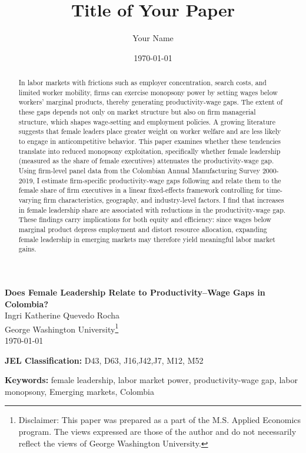 \documentclass[12pt]{article}
\title{\textbf{Title of Your Paper}}
\author{Your Name}
\date{\today}
\begin{document}
\begin{titlepage}
    \centering

    {\LARGE \textbf{Does Female Leadership Relate to Productivity--Wage Gaps in Colombia?}}\\[0.5in]

    {\large Ingri Katherine Quevedo Rocha}\\[0.1in]
    {\large George Washington University}\footnote{Disclaimer: This paper was prepared as a part of the M.S. Applied Economics program. The views expressed are those of the author and do not necessarily reflect the views of George Washington University.}\\[0.2in]
    {\large \today}\\[0.6in]

    \begin{minipage}{1\textwidth}
    \begin{abstract}
    
    In labor markets with frictions such as employer concentration, search costs, and limited worker mobility, firms can exercise monopsony power by setting wages below workers' marginal products, thereby generating productivity-wage gaps. The extent of these gaps depends not only on market structure but also on firm managerial structure, which shapes wage-setting and employment policies. A growing literature suggests that female leaders place greater weight on worker welfare and are less likely to engage in anticompetitive behavior. This paper examines whether these tendencies translate into reduced monopsony exploitation, specifically whether female leadership (measured as the share of female executives) attenuates the productivity-wage gap.
    Using firm-level panel data from the Colombian Annual Manufacturing Survey 2000-2019, I estimate firm-specific productivity-wage gaps following \textcite{yeh_monopsony_2022} and relate them to the female share of firm executives in a linear fixed-effects framework controlling for time-varying firm characteristics, geography, and industry-level factors. I find that increases in female leadership share are associated with reductions in the productivity-wage gap. These findings carry implications for both equity and efficiency: since wages below marginal product depress employment and distort resource allocation, expanding female leadership in emerging markets may therefore yield meaningful labor market gains.

    \end{abstract}

    \vspace{0.2cm}

    \noindent\textbf{JEL Classification:} D43, D63, J16,J42,J7, M12, M52

    \noindent\textbf{Keywords:} female leadership, labor market power, productivity-wage gap, labor monopsony, Emerging markets, Colombia

    \end{minipage}

    \vfill
\end{titlepage}
\end{document}
